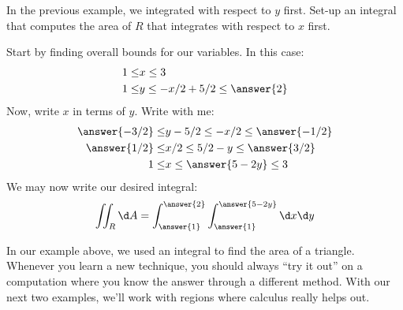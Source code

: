 \documentclass{ximera}
\begin{document}
\begin{question}
  In the previous example, we integrated with respect to $y$
  first. Set-up an integral that computes the area of $R$ that
  integrates with respect to $x$ first.
  \begin{prompt}
    Start by finding overall bounds for our variables. In this case:
    \begin{align*}
      1\le &x \le 3\\
      1\le &y \le -x/2 + 5/2 \le \answer{2}
    \end{align*}
    Now, write $x$ in terms of $y$. Write with me:
    \begin{align*}
      \answer{-3/2}\le &y -5/2 \le -x/2  \le \answer{-1/2}\\
      \answer{1/2}\le &x/2 \le 5/2-y  \le \answer{3/2}\\
      1\le & x\le \answer{5-2y}  \le 3
    \end{align*}
    We may now write our desired integral:
    \[
    \iint_R \d A = \int_{\answer{1}}^{\answer{2}}\int_{\answer{1}}^{\answer{5-2y}} \d x \d y
    \]
  \end{prompt}
\end{question}

In our example above, we used an integral to find the area of a
triangle. Whenever you learn a new technique, you should always ``try
it out'' on a computation where you know the answer through a
different method. With our next two examples, we'll work with regions
where calculus really helps out.
\end{document}
